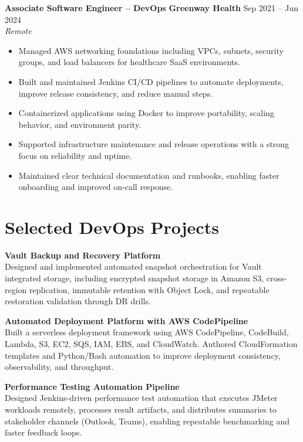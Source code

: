 \documentclass[a4paper,10pt]{article}
\newcommand{\role}[4]{%
  \noindent\textbf{#1} \textbar{} \textbf{#2} \hfill #3\\
  \textit{#4}\vspace{1pt}
}
\begin{document}
\begin{samepage}
\role{Associate Software Engineer -- DevOps}{Greenway Health}{Sep 2021 -- Jun 2024}{Remote}
\begin{itemize}
    \item Managed AWS networking foundations including VPCs, subnets, security groups, and load balancers for healthcare SaaS environments.
    \item Built and maintained Jenkins CI/CD pipelines to automate deployments, improve release consistency, and reduce manual steps.
    \item Containerized applications using Docker to improve portability, scaling behavior, and environment parity.
    \item Supported infrastructure maintenance and release operations with a strong focus on reliability and uptime.
    \item Maintained clear technical documentation and runbooks, enabling faster onboarding and improved on-call response.
\end{itemize}
\end{samepage}

\section*{Selected DevOps Projects}
\textbf{Vault Backup and Recovery Platform}\\
Designed and implemented automated snapshot orchestration for Vault integrated storage, including encrypted snapshot storage in Amazon S3, cross-region replication, immutable retention with Object Lock, and repeatable restoration validation through DR drills.

\textbf{Automated Deployment Platform with AWS CodePipeline}\\
Built a serverless deployment framework using AWS CodePipeline, CodeBuild, Lambda, S3, EC2, SQS, IAM, EBS, and CloudWatch. Authored CloudFormation templates and Python/Bash automation to improve deployment consistency, observability, and throughput.

\textbf{Performance Testing Automation Pipeline}\\
Designed Jenkins-driven performance test automation that executes JMeter workloads remotely, processes result artifacts, and distributes summaries to stakeholder channels (Outlook, Teams), enabling repeatable benchmarking and faster feedback loops.
\end{document}
